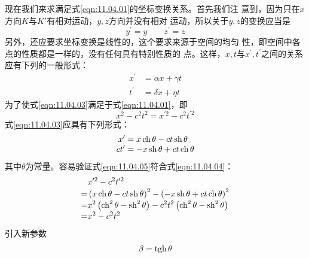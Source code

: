 现在我们来求满足式\eqref{eqn:11.04.01}的坐标变换关系。首先我们注
意到，因为只在$ x $方向$ K $与$ K' $有相对运动，$ y , z $方向并没有相对
运动，所以关于$ y , z $的变换应当是
\begin{equation}\label{eqn:11.04.02}
    y ^ { \prime } = y  \qquad  z ^ { \prime } = z
\end{equation}
另外，还应要求坐标变换是线性的，这个要求来源于空间的均匀
性，即空间中各点的性质都是一样的，没有任何具有特别性质的
点。这样，$ x, t $与$  x ^ { \prime }, t ^ { \prime }  $之间的关系应有下列的一般形式：
\begin{equation}\label{eqn:11.04.03}
    \begin{split}
        x ^ { \prime } &= \alpha x + \gamma t \\[-0.3em]
        t ^ { \prime } &= \delta x + \eta t
    \end{split}
\end{equation}
为了使式\eqref{eqn:11.04.03}满足于式\eqref{eqn:11.04.01}，即
\begin{equation}\label{eqn:11.04.04}
    x ^ { 2 } - c ^ { 2 } t ^ { 2 } = x ^ { \prime 2 } - c ^ { 2 } t ^ { \prime 2 }
\end{equation}
式\eqref{eqn:11.04.03}应具有下列形式：
\begin{equation}\label{eqn:11.04.05}
    \begin{split}
        x ^ { \prime } &= x \operatorname{ch} \theta - c t \operatorname{sh} \theta  \\[-0.3em]
    c t ^ { \prime } &= - x \operatorname{sh} \theta + c t \operatorname{ch} \theta
    \end{split}
\end{equation}
其中$\theta$为常量。容易验证式\eqref{eqn:11.04.05}符合式\eqref{eqn:11.04.04}：
\begin{equation*}
    \begin{split}
        &x ^ { \prime 2 } - c ^ { 2 } t ^ { \prime 2 } \\[-0.3em]
=& \left( x \operatorname{ch} \theta - c t \operatorname{sh} \theta \right) ^ { 2 } - \left( - x \operatorname{sh} \theta + c t \operatorname{ch} \theta \right) ^ { 2 } \\[-0.3em]
=& x ^ { 2 } \left( \operatorname{ch} ^ { 2 } \theta - \operatorname{sh} ^ { 2 } \theta \right) - c ^ { 2 } t ^ { 2 } \left( \operatorname{ch} ^ { 2 } \theta - \operatorname{sh} ^ { 2 } \theta \right) \\[-0.3em]
=& x ^ { 2 } - c ^ { 2 } t ^ { 2 }
    \end{split}
\end{equation*}
引入新参数\vspace{-1.8em}
\begin{equation*}
    \beta = \operatorname{tgh} \theta
\end{equation*}

